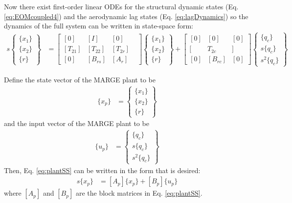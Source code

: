 Now there exist first-order linear ODEs for the structural dynamic states (Eq. \ref{eq:EOMcoupled4}) and the aerodynamic lag states (Eq. \ref{eq:lagDynamics}) so the dynamics of the full system can be written in state-space form:
\begin{align}
	\label{eq:plantSS}
	s \begin{Bmatrix} \{x_1\} \\ \{x_2\} \\ \{r\} \end{Bmatrix}
	&= \begin{bmatrix}
		[0] & [I] & [0] & \\
		[T_{21}] & [T_{22}] & [T_{2r}] \\
		[0] & [B_{rs}] & [A_r]
	\end{bmatrix}
	\begin{Bmatrix} \{x_1\} \\ \{x_2\} \\ \{r\} \end{Bmatrix}
	+ \begin{bmatrix}
		[0] & [0] & [0] \\
		[ & T_{2c} & ] \\
		[0] & [B_{rc}] & [0]
	\end{bmatrix}
	\begin{Bmatrix} \{q_c\} \\ s \{q_c\} \\ s^2 \{q_c\} \end{Bmatrix}
\end{align}

Define the state vector of the MARGE plant to be
\begin{align}
	\label{eq:plantState}
	\{x_p\} &= \begin{Bmatrix} \{x_1\} \\ \{x_2\} \\ \{r\} \end{Bmatrix}
\end{align}
and the input vector of the MARGE plant to be
\begin{align}
	\{u_p\} &= \begin{Bmatrix} \{q_c\} \\ s \{q_c\} \\ s^2 \{q_c\} \end{Bmatrix}
\end{align}
Then, Eq. \ref{eq:plantSS} can be written in the form that is desired:
\begin{align}
	s \{x_p\} &= [A_p] \{x_p\} + [B_p] \{u_p\}
\end{align}
where $[A_p]$ and $[B_p]$ are the block matrices in Eq. \ref{eq:plantSS}.

